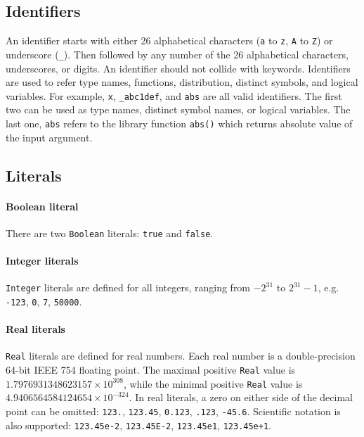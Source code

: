 \documentclass[12pt]{article}
\begin{document}
\subsection{Identifiers}\label{identifier-section}
An identifier starts with either 26 alphabetical characters (\verb|a| to \verb|z|, \verb|A| to \verb|Z|) or underscore (\verb|_|). Then followed by any number of the 26 alphabetical characters, underscores, or digits. 
An identifier should not collide with keywords. 
Identifiers are used to refer type names, functions, distribution, distinct symbols, and logical variables. 
For example, \verb|x|, \verb|_abc1def|, and \verb|abs| are all valid identifiers. 
The first two can be used as type names, distinct symbol names, or logical variables. 
The last one, \verb|abs| refers to the library function \verb|abs()| which returns absolute value of the input argument.

\subsection{Literals}
\label{sec:literals}
\paragraph{Boolean literal}

There are two \verb|Boolean| literals: \verb|true| and \verb|false|. 

\paragraph{Integer literals}
\verb|Integer| literals are defined for all integers, ranging from $-2^{31}$ to $2^{31}-1$, e.g. \verb|-123|, \verb|0|,
\verb|7|, \verb|50000|.

\paragraph{Real literals}
\verb|Real| literals are defined for real numbers. Each real number is a
double-precision 64-bit IEEE 754 floating point. The maximal positive
\verb|Real| value is $1.7976931348623157 \times 10^{308}$, while the minimal
positive \verb|Real| value is $4.9406564584124654 \times 10^{-324}$. 
In real literals, a zero on either side of the decimal point can be omitted: \verb|123.|, \verb|123.45|, \verb|0.123|,
\verb|.123|, \verb|-45.6|. Scientific notation is also supported:
\verb|123.45e-2|, \verb|123.45E-2|, \verb|123.45e1|, \verb|123.45e+1|.
\end{document}
